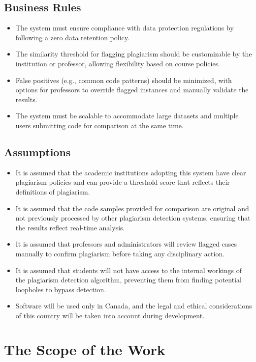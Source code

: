 \documentclass[12pt]{article}
\begin{document}
\subsection{Business Rules}
\begin{itemize}
  \item The system must ensure compliance with data protection regulations by following a zero data retention policy.
  \item The similarity threshold for flagging plagiarism should be customizable by the institution or professor, allowing flexibility based on course policies.
  \item False positives (e.g., common code patterns) should be minimized, with options for professors to override flagged instances and manually validate the results.
  \item The system must be scalable to accommodate large datasets and multiple users submitting code for comparison at the same time.
\end{itemize}
\subsection{Assumptions}
\begin{itemize}
  \item It is assumed that the academic institutions adopting this system have clear plagiarism policies and can provide a threshold score that reflects their definitions of plagiarism.
  \item It is assumed that the code samples provided for comparison are original and not previously processed by other plagiarism detection systems, ensuring that the results reflect real-time analysis.
  \item It is assumed that professors and administrators will review flagged cases manually to confirm plagiarism before taking any disciplinary action.
  \item It is assumed that students will not have access to the internal workings of the plagiarism detection algorithm, preventing them from finding potential loopholes to bypass detection.
  \item Software will be used only in Canada, and the legal and ethical considerations of this country will be taken into account during development.
\end{itemize}

\section{The Scope of the Work}
\end{document}
